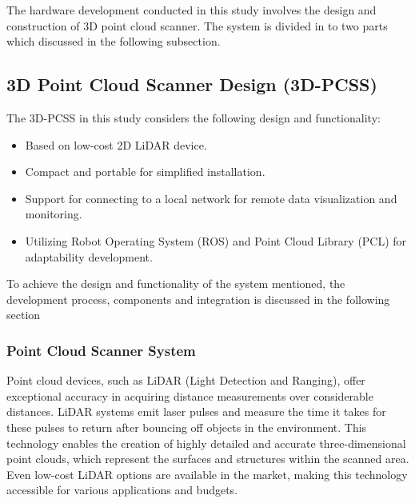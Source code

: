 The hardware development conducted in this study involves the design and construction of 3D point cloud scanner. The system is divided in to two parts which discussed in the following subsection.



\subsection{3D Point Cloud Scanner Design (3D-PCSS)}
\label{ch3:subsec:3d_point_cloud_scanner_design}

The 3D-PCSS in this study considers the following design and functionality:
\begin{itemize}
	\item Based on low-cost 2D LiDAR device.
	\item Compact and portable for simplified installation.
	\item Support for connecting to a local network for remote data visualization and monitoring.
	\item Utilizing Robot Operating System (ROS) and Point Cloud Library (PCL) for adaptability development.
\end{itemize}

To achieve the design and functionality of the system mentioned, the development process, components and integration is discussed in the following section

\subsubsection*{Point Cloud Scanner System}

Point cloud devices, such as LiDAR (Light Detection and Ranging), offer exceptional accuracy in acquiring distance measurements over considerable distances. LiDAR systems emit laser pulses and measure the time it takes for these pulses to return after bouncing off objects in the environment. This technology enables the creation of highly detailed and accurate three-dimensional point clouds, which represent the surfaces and structures within the scanned area. Even low-cost LiDAR options are available in the market, making this technology accessible for various applications and budgets.

